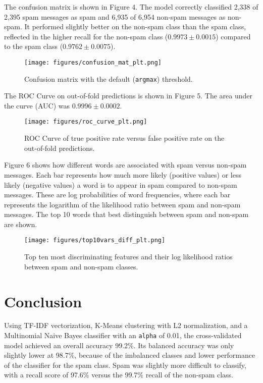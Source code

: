 \documentclass{article}      %
\begin{document}
The confusion matrix is shown in Figure 4. The model correctly classified 2,338 of 2,395 spam messages as spam and 6,935 of 6,954 non-spam messages as non-spam. It performed slightly better on the non-spam class than the spam class, reflected in the higher recall for the non-spam class ($0.9973 \pm 0.0015$) compared to the spam class ($0.9762 \pm 0.0075$).

\begin{figure}[!h]
    \centering
    \texttt{[image: figures/confusion\_mat\_plt.png]}
    \caption{Confusion matrix with the default (\texttt{argmax}) threshold.}
    \label{fig:confusionMatrix}
\end{figure}

The ROC Curve on out-of-fold predictions is shown in Figure 5. The area under the curve (AUC) was $0.9996 \pm 0.0002$.

\begin{figure}[!h]
    \centering
    \texttt{[image: figures/roc\_curve\_plt.png]}
    \caption{ROC Curve of true positive rate versus false positive rate on the out-of-fold predictions.}
    \label{fig:ROC_curve}
\end{figure}

Figure 6 shows how different words are associated with spam versus non-spam messages. Each bar represents how much more likely (positive values) or less likely (negative values) a word is to appear in spam compared to non-spam messages. These are log probabilities of word frequencies, where each bar represents the logarithm of the likelihood ratio between spam and non-spam messages. The top 10 words that best distinguish between spam and non-spam are shown.

\begin{figure}[!h]
    \centering
    \texttt{[image: figures/top10vars\_diff\_plt.png]}
    \caption{Top ten most discriminating features and their log likelihood ratios between spam and non-spam classes.}
    \label{fig:Top10Vars}
\end{figure}

\section{Conclusion}

Using TF-IDF vectorization, K-Means clustering with L2 normalization, and a Multinomial Naive Bayes classifier with an \texttt{alpha} of 0.01, the cross-validated model achieved an overall accuracy 99.2\%. Its balanced accuracy was only slightly lower at 98.7\%, because of the imbalanced classes and lower performance of the classifier for the spam class. Spam was slightly more difficult to classify, with a recall score of 97.6\% versus the 99.7\% recall of the non-spam class. 
\end{document}
